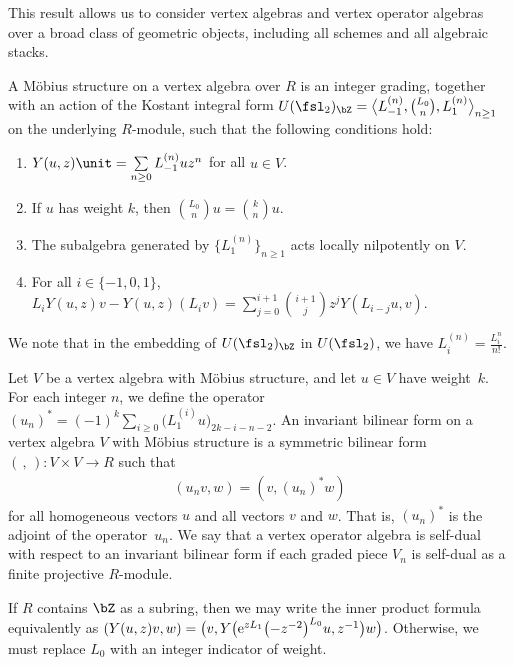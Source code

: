 \begin{rem}This result allows us to consider vertex algebras and vertex operator algebras over a broad class of geometric objects, including all schemes and all algebraic stacks.
\end{rem}

\begin{defn}A M\"obius structure on a vertex algebra over $R$ is an integer grading, together with an action of the Kostant integral form $U(\fsl_2)_{\bZ} = \big\langle L_{-1}^{(n)}, \binom{L_0}{n}, L_1^{(n)} \big\rangle_{n \geq 1}$ on the underlying $R$-module, such that the following conditions hold:
\begin{enumerate}\itemsep=0pt
\item $Y(u,z)\unit = \sum\limits_{n \geq 0} L_{-1}^{(n)}u z^n$ for all $u \in V$.
\item If $u$ has weight $k$, then $\binom{L_0}{n}u = \binom{k}{n}u$.
\item The subalgebra generated by $\{ L_1^{(n)} \}_{n \geq 1}$ acts locally nilpotently on $V$.
\item For all $i \in \{-1,0,1\}$, $L_i Y(u,z)v - Y(u,z)(L_i v) = \sum\limits_{j =0}^{i+1} \binom{i+1}{j} z^j Y(L_{i-j} u,v)$.
\end{enumerate}
We note that in the embedding of $U(\fsl_2)_{\bZ}$ in $U(\fsl_2)$, we have $L_i^{(n)} = \frac{L_i^n}{n!}$.
\end{defn}

\begin{defn}Let $V$ be a vertex algebra with M\"obius structure, and let $u \in V$ have weight~$k$. For each integer $n$, we define the operator $(u_n)^* = (-1)^k \sum\limits_{i \geq 0} \big(L_1^{(i)} u\big)_{2k-i-n-2}$. An invariant bilinear form on a vertex algebra $V$ with M\"obius structure is a symmetric bilinear form $(\,,\,)\colon V \times V \to R$ such that
\begin{gather*} (u_n v,w) = (v, (u_n)^* w) \end{gather*}
for all homogeneous vectors $u$ and all vectors $v$ and $w$. That is, $(u_n)^*$ is the adjoint of the operator~$u_n$. We say that a vertex operator algebra is self-dual with respect to an invariant bilinear form if each graded piece $V_n$ is self-dual as a finite projective $R$-module.
\end{defn}

\begin{rem}If $R$ contains $\bZ$ as a subring, then we may write the inner product formula equivalently as $(Y(u,z)v,w) = \big(v, Y\big({\rm e}^{zL_1}\big({-}z^{-2}\big)^{L_0}u, z^{-1}\big)w\big)$. Otherwise, we must replace $L_0$ with an integer indicator of weight.
\end{rem}

